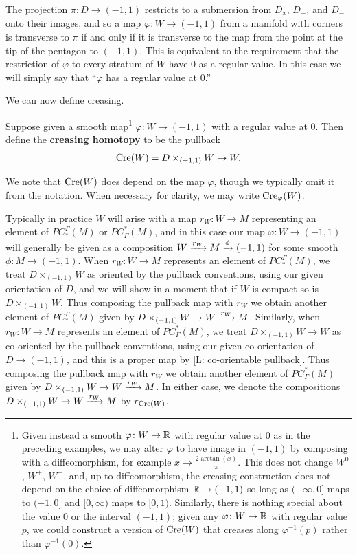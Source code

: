 The projection $\pi:D \to (-1,1)$ restricts to a submersion from $D_x$, $D_+$, and $D_-$ onto their images, and so a map $\varphi: W \to (-1,1)$ from a manifold with corners is transverse to $\pi$ if and only if it is transverse to the map from the point at the tip of the pentagon to $(-1,1)$. This is equivalent to the requirement that the restriction of $\varphi$ to every stratum of $W$ have $0$ as a regular value. In this case we will simply say that ``$\varphi$ has a regular value at $0$.''

We can now define creasing.

\begin{definition}
 Suppose given a smooth map\footnote{Given instead a smooth $\varphi \colon W \to \mathbb{R}$ with regular value at $0$ as in the preceding examples, we may alter $\varphi$ to have image in $(-1,1)$ by composing with a diffeomorphism, for example $x \to \frac{2\arctan(x)}{\pi}$. This does not change $W^0$, $W^+$, $W^-$, and, up to diffeomorphism, the creasing construction does not depend on the choice of diffeomorphism $\mathbb{R} \to (-1,1)$ so long as $(-\infty,0]$ maps to $(-1,0]$ and $[0,\infty)$ maps to $[0,1)$. Similarly, there is nothing special about the value $0$ or the interval $(-1,1)$; given any $\varphi \colon W \to \mathbb{R}$ with regular value $p$, we could construct a version of $\mathrm{Cre}(W)$ that creases along $\varphi^{-1}(p)$ rather than $\varphi^{-1}(0)$.
} $\varphi \colon W \to (-1,1)$ with a regular value at $0$. Then define the \textbf{creasing homotopy} to be the pullback
$$\mathrm{Cre}(W) = D\times_{(-1,1)} W \to W.$$

We note that
$\mathrm{Cre}(W)$ does depend on the map $\varphi$, though we typically omit it from the notation. When necessary for clarity, we may write $\mathrm{Cre}_\varphi(W)$.


Typically in practice $W$ will arise with a map $r_W \colon W \to M$ representing an element of $PC_*^\Gamma(M)$ or $PC^*_\Gamma(M)$, and in this case our map $\varphi: W \to (-1,1)$ will generally be given as a composition
 $W\xrightarrow{r_W}M\xrightarrow{\phi} (-1,1)$ for some smooth $\phi \colon M \to (-1,1)$. When $r_W \colon W \to M$ represents an element of $PC_*^\Gamma(M)$, we treat $D\times_{(-1,1)} W$ as oriented by the pullback conventions, using our given orientation of $D$, and we will show in a moment that if $W$ is compact so is $D\times_{(-1,1)} W$. Thus composing the pullback map with $r_W$ we obtain another element of $PC_*^\Gamma(M)$ given by $D\times_{(-1,1)} W \to W\xrightarrow{r_W}M$. Similarly, when $r_W \colon W \to M$ represents an element of $PC^*_\Gamma(M)$, we treat $D\times_{(-1,1)} W \to W$ as co-oriented by the pullback conventions, using our given co-orientation of $D \to (-1,1)$, and this is a proper map by \cref{L: co-orientable pullback}.
Thus composing the pullback map with $r_W$ we obtain another element of $PC^*_\Gamma(M)$ given by $D\times_{(-1,1)} W \to W\xrightarrow{r_W}M$. In either case, we denote the compositions $D\times_{(-1,1)} W \to W\xrightarrow{r_W}M$ by $r_{\mathrm{Cre}(W)}$.


\end{definition}
